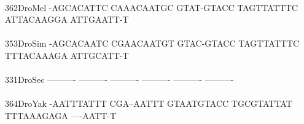 \documentclass[11pt,twoside,reqno,a4paper]{article}
\begin{document}
{\\
362\hspace*{2\charwidth}DroMel	-AGCACATTC	CAAACAATGC	GTAT-GTACC	TAGTTATTTC	ATTACAAGGA	ATTGAATT-T	\\
\hspace*{5\charwidth}\hspace*{7\charwidth}\hspace*{1\charwidth}\hspace*{1\charwidth}\hspace*{1\charwidth}\hspace*{1\charwidth}\hspace*{1\charwidth}\hspace*{1\charwidth}\\
353\hspace*{2\charwidth}DroSim	-AGCACAATC	CGAACAATGT	GTAC-GTACC	TAGTTATTTC	TTTACAAAGA	ATTGCATT-T	\\
\hspace*{5\charwidth}\hspace*{7\charwidth}\hspace*{1\charwidth}\hspace*{1\charwidth}\hspace*{1\charwidth}\hspace*{1\charwidth}\hspace*{1\charwidth}\hspace*{1\charwidth}\\
331\hspace*{2\charwidth}DroSec	----------	----------	----------	----------	----------	----------	\\
\hspace*{5\charwidth}\hspace*{7\charwidth}\hspace*{1\charwidth}\hspace*{1\charwidth}\hspace*{1\charwidth}\hspace*{1\charwidth}\hspace*{1\charwidth}\hspace*{1\charwidth}\\
364\hspace*{2\charwidth}DroYak	-AATTTATTT	CGA--AATTT	GTAATGTACC	TGCGTATTAT	TTTAAAGAGA	----AATT-T	\\
\hspace*{5\charwidth}\hspace*{7\charwidth}\hspace*{1\charwidth}\hspace*{1\charwidth}\hspace*{1\charwidth}\hspace*{1\charwidth}\hspace*{1\charwidth}\hspace*{1\charwidth}\\
}
\end{document}
